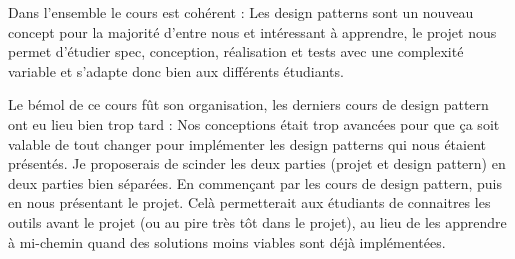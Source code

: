 Dans l'ensemble le cours est cohérent : Les design patterns sont un nouveau concept pour la majorité d'entre nous et intéressant à apprendre, le projet nous permet d'étudier spec, conception, réalisation et tests avec une complexité variable et s'adapte donc bien aux différents étudiants.

Le bémol de ce cours fût son organisation, les derniers cours de design pattern ont eu lieu bien trop tard : Nos conceptions était trop avancées pour que ça soit valable de tout changer pour implémenter les design patterns qui nous étaient présentés. Je proposerais de scinder les deux parties (projet et design pattern) en deux parties bien séparées. En commençant par les cours de design pattern, puis en nous présentant le projet. Celà permetterait aux étudiants de connaitres les outils avant le projet (ou au pire très tôt dans le projet), au lieu de les apprendre à mi-chemin quand des solutions moins viables sont déjà implémentées.
